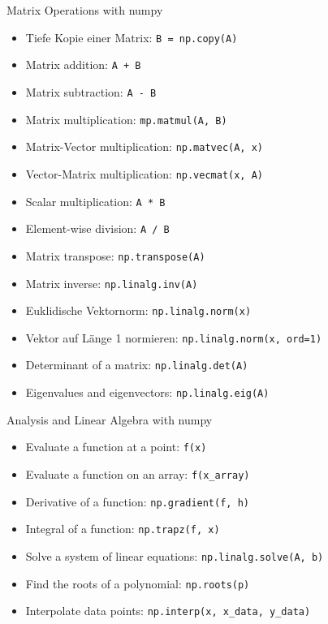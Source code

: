 \begin{concept}{Matrix Operations with numpy}
    \begin{itemize}
        \item Tiefe Kopie einer Matrix: \texttt{B = np.copy(A)}
        \item Matrix addition: \texttt{A + B}
        \item Matrix subtraction: \texttt{A - B}
        \item Matrix multiplication: \texttt{mp.matmul(A, B)}
        \item Matrix-Vector multiplication: \texttt{np.matvec(A, x)}
        \item Vector-Matrix multiplication: \texttt{np.vecmat(x, A)}
        \item Scalar multiplication: \texttt{A * B}
        \item Element-wise division: \texttt{A / B}
        \item Matrix transpose: \texttt{np.transpose(A)}
        \item Matrix inverse: \texttt{np.linalg.inv(A)}
        \item Euklidische Vektornorm: \texttt{np.linalg.norm(x)}
        \item Vektor auf Länge 1 normieren: \texttt{np.linalg.norm(x, ord=1)}
        \item Determinant of a matrix: \texttt{np.linalg.det(A)}
        \item Eigenvalues and eigenvectors: \texttt{np.linalg.eig(A)}
    \end{itemize}
\end{concept}

\begin{theorem}{Analysis and Linear Algebra with numpy}
    \begin{itemize}
        \item Evaluate a function at a point: \texttt{f(x)}
        \item Evaluate a function on an array: \texttt{f(x\_array)}
        \item Derivative of a function: \texttt{np.gradient(f, h)}
        \item Integral of a function: \texttt{np.trapz(f, x)}
        \item Solve a system of linear equations: \texttt{np.linalg.solve(A, b)}
        \item Find the roots of a polynomial: \texttt{np.roots(p)}
        \item Interpolate data points: \texttt{np.interp(x, x\_data, y\_data)}
    \end{itemize}
\end{theorem}

